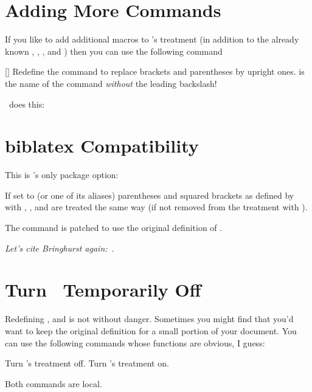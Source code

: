 \documentclass[load-preamble+]{cnltx-doc}
\begin{document}
\section{Adding More Commands}
If you like to add additional macros to \embrac's treatment
(in addition to the already known , , , and
) then you can use the following command
\begin{commands}
  []
    Redefine the command  to replace brackets and parentheses by
    upright ones.  is the name of the command \emph{without} the
    leading backslash!
\end{commands}
\embrac\ does this:  
\begin{sourcecode}
\end{sourcecode}

\section{biblatex Compatibility}
This is \embrac's only package option:
\begin{options}
    If set to  (or one of its aliases) parentheses and squared
    brackets as defined by  with ,
    ,  and  are
    treated the same way (if not removed from the treatment with ).
   
    The command  is patched to use the original definition
    of .
\end{options}

\begin{example}
  \emph{Let's cite Bringhurst again:~\cite{bringhurst04}}.
\end{example}

\section{Turn \embrac\ Temporarily Off}
Redefining ,  and  is not without danger.
Sometimes you might find that you'd want to keep the original definition for a
small portion of your document.  You can use the following commands whose
functions are obvious, I guess:
\begin{commands}
    Turn \embrac's treatment off.
    Turn \embrac's treatment on.
\end{commands}
Both commands are local.
\end{document}
